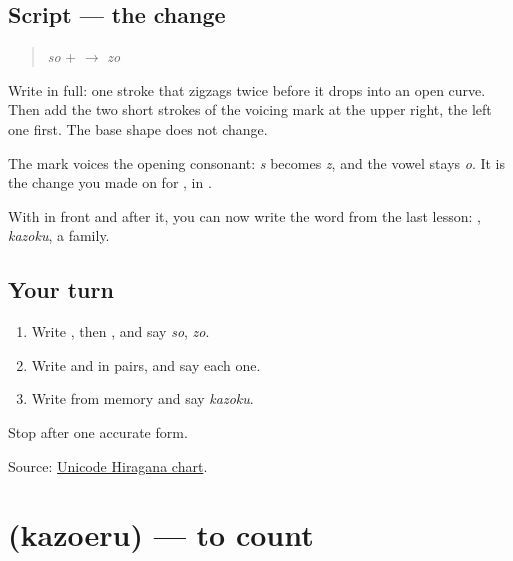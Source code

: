 \subsection*{Script — the change}

\begin{quote}
\textbf{} \emph{so} + \textbf{} $\to$ \textbf{} \emph{zo}
\end{quote}

Write \textbf{} in full: one stroke that zigzags twice before it drops into an open curve. Then add the two short strokes of the voicing mark at the upper right, the left one first. The base shape does not change.

The mark voices the opening consonant: \emph{s} becomes \emph{z}, and the vowel stays \emph{o}. It is the change you made on \textbf{} for \textbf{}, in \textbf{}.

With \textbf{} in front and \textbf{} after it, you can now write the word from the last lesson: \textbf{}, \emph{kazoku}, a family.

\subsection*{Your turn}
\begin{enumerate}
\raggedright
  \item Write \textbf{}, then \textbf{}, and say \emph{so}, \emph{zo}.
  \item Write \textbf{ } and \textbf{ } in pairs, and say each one.
  \item Write \textbf{} from memory and say \emph{kazoku}.
\end{enumerate}

\begin{tcolorbox}[breakable,colback=teal!4,colframe=teal!35!black,title={Before you move on}]
Stop after one accurate form.

Source: \href{https://www.unicode.org/charts/PDF/U3040.pdf}{Unicode Hiragana chart}.
\end{tcolorbox}
\section[\texorpdfstring{\ja{かぞえる} (kazoeru)}{かぞえる (kazoeru)}]{ (kazoeru) — to count}

